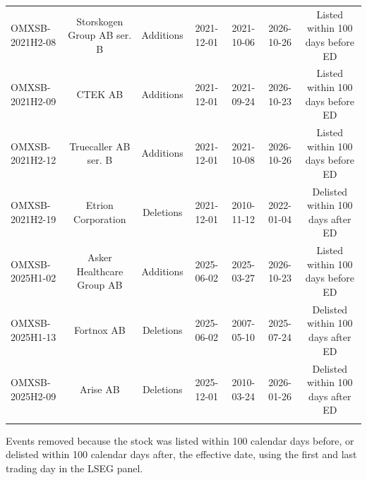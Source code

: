 \begin{threeparttable}
\begin{tabular}{@{}lcccccc}
\addlinespace[0.25ex]
\addlinespace[0.25ex]
OMXSB-2021H2-08 & Storskogen Group AB ser. B & Additions & 2021-12-01 & 2021-10-06 & 2026-10-26 & Listed within 100 days before ED \\
\addlinespace[0.25ex]
\addlinespace[0.25ex]
OMXSB-2021H2-09 & CTEK AB & Additions & 2021-12-01 & 2021-09-24 & 2026-10-23 & Listed within 100 days before ED \\
\addlinespace[0.25ex]
\addlinespace[0.25ex]
OMXSB-2021H2-12 & Truecaller AB ser. B & Additions & 2021-12-01 & 2021-10-08 & 2026-10-26 & Listed within 100 days before ED \\
\addlinespace[0.25ex]
\addlinespace[0.25ex]
OMXSB-2021H2-19 & Etrion Corporation & Deletions & 2021-12-01 & 2010-11-12 & 2022-01-04 & Delisted within 100 days after ED \\
\addlinespace[0.25ex]
\addlinespace[0.25ex]
OMXSB-2025H1-02 & Asker Healthcare Group AB & Additions & 2025-06-02 & 2025-03-27 & 2026-10-23 & Listed within 100 days before ED \\
\addlinespace[0.25ex]
\addlinespace[0.25ex]
OMXSB-2025H1-13 & Fortnox AB & Deletions & 2025-06-02 & 2007-05-10 & 2025-07-24 & Delisted within 100 days after ED \\
\addlinespace[0.25ex]
\addlinespace[0.25ex]
OMXSB-2025H2-09 & Arise AB & Deletions & 2025-12-01 & 2010-03-24 & 2026-01-26 & Delisted within 100 days after ED \\
\addlinespace[0.25ex]
\bottomrule
\end{tabular}
\endgroup
\noindent\begin{minipage}{\linewidth}\smallskip\footnotesize
Events removed because the stock was listed within 100 calendar days before, or delisted within 100 calendar days after, the effective date, using the first and last trading day in the LSEG panel.\end{minipage}

\end{threeparttable}